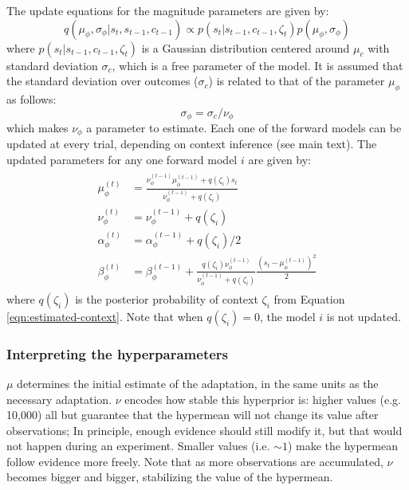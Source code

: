 \documentclass[a4paper,doc,floatsintext,natbib]{apa6}%
\def \eref #1{Equation \ref{#1}}   %
\begin{document}
The update equations for the magnitude parameters are given by:
\begin{equation}
q(\mu_\phi, \sigma_\phi | s_t, s_{t-1}, c_{t-1}) \propto p(s_t |
s_{t-1}, c_{t-1}, \zeta_t)p(\mu_\phi, \sigma_\phi) \label{eqn:context-from-x}
\end{equation}
where $p(s_t | s_{t-1}, c_{t-1}, \zeta_t)$ is a Gaussian distribution centered
around $\mu_c$ with standard deviation $\sigma_c$, which is a free parameter of
the model. It is assumed that the standard deviation over outcomes ($\sigma_c$)
is related to that of the parameter $\mu_\phi$ as follows:
\begin{equation}
\sigma_\phi = \sigma_c / \nu_\phi
\end{equation}
which makes $\nu_\phi$ a parameter to estimate. Each one of the forward models can
be updated at every trial, depending on context inference (see main text). The
updated parameters for any one forward model $i$ are given by:
\begin{align}
  \begin{split}
  \mu_\phi^{(t)} &= \frac{\nu_\phi^{(t-1)} \mu_\phi^{(t-1)} + q(\zeta_i)s_t}{\nu_\phi^{(t-1)} + q(\zeta_i)} \\
  \nu_\phi^{(t)} &= \nu_\phi^{(t-1)} + q(\zeta_i) \\
  \alpha_\phi^{(t)} &= \alpha_\phi^{(t-1)} + q(\zeta_i) / 2 \\
  \beta_\phi^{(t)} &= \beta_\phi^{(t-1)} + \frac{q(\zeta_i)\nu_\phi^{(t-1)}}{\nu_\phi^{(t-1)} +
    q(\zeta_i)}\frac{\left(s_t - \mu_\phi^{(t-1)}\right)^2}{2}  \label{eqn:update-full}
  \end{split}
\end{align}
where $q(\zeta_i)$ is the posterior probability of context $\zeta_i$ from
\eref{eqn:estimated-context}. Note that when $q(\zeta_i) = 0$, the model $i$ is not
updated.

\subsubsection{Interpreting the hyperparameters}
\label{sec:interpreting-hyperparameters}
$\mu$ determines the initial estimate of the adaptation, in the same units as
the necessary adaptation. $\nu$ encodes how stable this hyperprior is: higher
values (e.g. 10,000) all but guarantee that the hypermean will not change its
value after observations; In principle, enough evidence should still modify it,
but that would not happen during an experiment. Smaller values (i.e. $\sim 1$)
make the hypermean follow evidence more freely. Note that as more observations
are accumulated, $\nu$ becomes bigger and bigger, stabilizing the value of the
hypermean.
\end{document}
